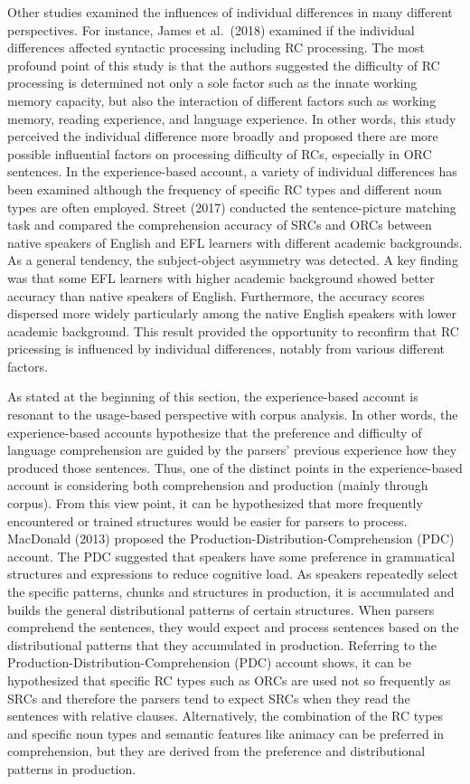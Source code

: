 \documentclass[
]{article}
\begin{document}
Other studies examined the influences of individual differences in many
different perspectives. For instance, James et al.~(2018) examined if
the individual differences affected syntactic processing including RC
processing. The most profound point of this study is that the authors
suggested the difficulty of RC processing is determined not only a sole
factor such as the innate working memory capacity, but also the
interaction of different factors such as working memory, reading
experience, and language experience. In other words, this study
perceived the individual difference more broadly and proposed there are
more possible influential factors on processing difficulty of RCs,
especially in ORC sentences. In the experience-based account, a variety
of individual differences has been examined although the frequency of
specific RC types and different noun types are often employed. Street
(2017) conducted the sentence-picture matching task and compared the
comprehension accuracy of SRCs and ORCs between native speakers of
English and EFL learners with different academic backgrounds. As a
general tendency, the subject-object asymmetry was detected. A key
finding was that some EFL learners with higher academic background
showed better accuracy than native speakers of English. Furthermore, the
accuracy scores dispersed more widely particularly among the native
English speakers with lower academic background. This result provided
the opportunity to reconfirm that RC pricessing is influenced by
individual differences, notably from various different factors.

As stated at the beginning of this section, the experience-based account
is resonant to the usage-based perspective with corpus analysis. In
other words, the experience-based accounts hypothesize that the
preference and difficulty of language comprehension are guided by the
parsers' previous experience how they produced those sentences. Thus,
one of the distinct points in the experience-based account is
considering both comprehension and production (mainly through corpus).
From this view point, it can be hypothesized that more frequently
encountered or trained structures would be easier for parsers to
process. MacDonald (2013) proposed the
Production-Distribution-Comprehension (PDC) account. The PDC suggested
that speakers have some preference in grammatical structures and
expressions to reduce cognitive load. As speakers repeatedly select the
specific patterns, chunks and structures in production, it is
accumulated and builds the general distributional patterns of certain
structures. When parsers comprehend the sentences, they would expect and
process sentences based on the distributional patterns that they
accumulated in production. Referring to the
Production-Distribution-Comprehension (PDC) account shows, it can be
hypothesized that specific RC types such as ORCs are used not so
frequently as SRCs and therefore the parsers tend to expect SRCs when
they read the sentences with relative clauses. Alternatively, the
combination of the RC types and specific noun types and semantic
features like animacy can be preferred in comprehension, but they are
derived from the preference and distributional patterns in production.
\end{document}
